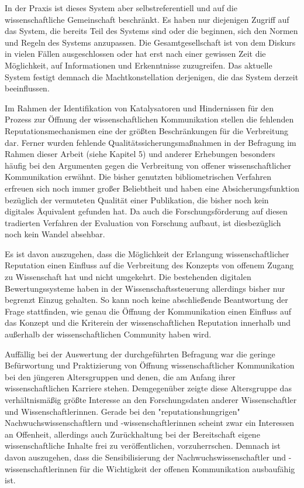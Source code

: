 In der Praxis ist dieses System aber selbstreferentiell und auf die wissenschaftliche Gemeinschaft beschränkt. Es haben nur diejenigen Zugriff auf das System, die bereits Teil des Systems sind oder die beginnen, sich den Normen und Regeln des Systems anzupassen. Die Gesamtgesellschaft ist von dem Diskurs in vielen Fällen ausgeschlossen oder hat erst nach einer gewissen Zeit die Möglichkeit, auf Informationen und Erkenntnisse zuzugreifen. Das aktuelle System festigt demnach die Machtkonstellation derjenigen, die das System derzeit beeinflussen.

Im Rahmen der Identifikation von Katalysatoren und Hindernissen für den Prozess zur Öffnung der wissenschaftlichen Kommunikation stellen die fehlenden Reputationsmechanismen eine der größten Beschränkungen für die Verbreitung dar. Ferner wurden fehlende Qualitätssicherungsmaßnahmen in der Befragung im Rahmen dieser Arbeit (siehe Kapitel 5) und anderer Erhebungen \cite{European_Commission_2015b} besonders häufig bei den Argumenten gegen die Verbreitung von offener wissenschaftlicher Kommunikation erwähnt. Die bisher genutzten bibliometrischen Verfahren erfreuen sich noch immer großer Beliebtheit und haben eine Absicherungsfunktion bezüglich der vermuteten Qualität einer Publikation, die bisher noch kein digitales Äquivalent gefunden hat. Da auch die Forschungsförderung auf diesen tradierten Verfahren der Evaluation von Forschung aufbaut, ist diesbezüglich noch kein Wandel absehbar.

Es ist davon auszugehen, dass die Möglichkeit der Erlangung wissenschaftlicher Reputation einen Einfluss auf die Verbreitung des Konzepts von offenem Zugang zu Wissenschaft hat und nicht umgekehrt. Die bestehenden digitalen Bewertungssysteme haben in der Wissenschaftssteuerung allerdings bisher nur begrenzt Einzug gehalten. So kann noch keine abschließende Beantwortung der Frage stattfinden, wie genau die Öffnung der Kommunikation einen Einfluss auf das Konzept und die Kriterein der wissenschaftlichen Reputation innerhalb und außerhalb der wissenschaftlichen Community haben wird.

Auffällig bei der Auswertung der durchgeführten Befragung war die geringe Befürwortung und Praktizierung von Öffnung wissenschaftlicher Kommunikation bei den jüngeren Altersgruppen und denen, die am Anfang ihrer wissenschaftlichen Karriere stehen. Demgegenüber zeigte diese Altersgruppe das verhältnismäßig größte Interesse an den Forschungsdaten anderer Wissenschaftler und Wissenschaftlerinnen. Gerade bei den "reputationshungrigen" Nachwuchswissenschaftlern und -wissenschaftlerinnen scheint zwar ein Interessen an Offenheit, allerdings auch Zurückhaltung bei der Bereitschaft eigene wissenschaftliche Inhalte frei zu veröffentlichen, vorzuherrschen. Demnach ist davon auszugehen, dass die Sensibilisierung der Nachwuchswissenschaftler und -wissenschaftlerinnen für die Wichtigkeit der offenen Kommunikation ausbaufähig ist.

